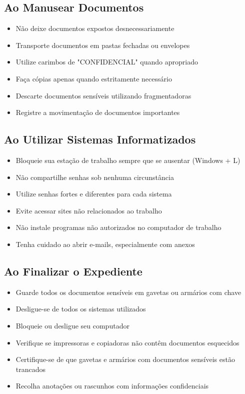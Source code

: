 \documentclass[12pt,a4paper]{article}
\begin{document}
\subsection{Ao Manusear Documentos}
\begin{itemize}
    \item Não deixe documentos expostos desnecessariamente
    \item Transporte documentos em pastas fechadas ou envelopes
    \item Utilize carimbos de "CONFIDENCIAL" quando apropriado
    \item Faça cópias apenas quando estritamente necessário
    \item Descarte documentos sensíveis utilizando fragmentadoras
    \item Registre a movimentação de documentos importantes
\end{itemize}

\subsection{Ao Utilizar Sistemas Informatizados}
\begin{itemize}
    \item Bloqueie sua estação de trabalho sempre que se ausentar (Windows + L)
    \item Não compartilhe senhas sob nenhuma circunstância
    \item Utilize senhas fortes e diferentes para cada sistema
    \item Evite acessar sites não relacionados ao trabalho
    \item Não instale programas não autorizados no computador de trabalho
    \item Tenha cuidado ao abrir e-mails, especialmente com anexos
\end{itemize}

\subsection{Ao Finalizar o Expediente}
\begin{itemize}
    \item Guarde todos os documentos sensíveis em gavetas ou armários com chave
    \item Desligue-se de todos os sistemas utilizados
    \item Bloqueie ou desligue seu computador
    \item Verifique se impressoras e copiadoras não contêm documentos esquecidos
    \item Certifique-se de que gavetas e armários com documentos sensíveis estão trancados
    \item Recolha anotações ou rascunhos com informações confidenciais
\end{itemize}
\end{document}
